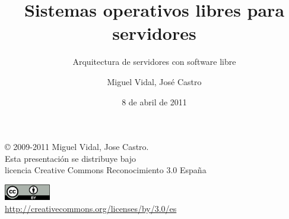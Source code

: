 \documentclass{beamer}
\begin{document}
\title{Sistemas operativos libres para servidores}
\subtitle{Arquitectura de servidores con software libre}
\author{Miguel Vidal, José Castro}
\date{8 de abril de 2011}


\begin{frame}
  \vspace{2cm}
  \begin{flushright}
    {\footnotesize \copyright{} 2009-2011 Miguel Vidal, Jose Castro.} \\
    \medskip
    {\scriptsize Esta presentación se distribuye bajo \\ licencia Creative Commons Reconocimiento 3.0 España}
  \end{flushright}
  \begin{center}
    \href{http://creativecommons.org/licenses/by/3.0/es}{\includegraphics[width=2cm]{format/cc-by.png}} \\
    {\tiny \url{http://creativecommons.org/licenses/by/3.0/es}}
  \end{center}
\end{frame}%

\end{document}
